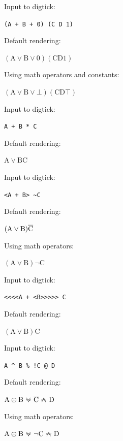 \documentclass{article}
\begin{document}
\begin{minipage}{\linewidth}
Input to digtick:
\begin{sourcebox}\texttt{(A + B + 0) (C D 1)}\end{sourcebox}
Default rendering:
\begin{renderedbox}$\mathrm{(A \vee B \vee 0) (C D 1)}$\end{renderedbox}
Using math operators and constants:
\begin{renderedbox}$\mathrm{(A \vee B \vee \bot) (C D \top)}$\end{renderedbox}
\end{minipage}
\vspace{2cm}

\begin{minipage}{\linewidth}
Input to digtick:
\begin{sourcebox}\texttt{A + B * C}\end{sourcebox}
Default rendering:
\begin{renderedbox}$\mathrm{A \vee B C}$\end{renderedbox}
\end{minipage}
\vspace{2cm}

\begin{minipage}{\linewidth}
Input to digtick:
\begin{sourcebox}\texttt{<A + B> \~{}C}\end{sourcebox}
Default rendering:
\begin{renderedbox}$\mathrm{(A \vee B) \overline{C}}$\end{renderedbox}
Using math operators:
\begin{renderedbox}$\mathrm{(A \vee B) \neg C}$\end{renderedbox}
\end{minipage}
\vspace{2cm}

\begin{minipage}{\linewidth}
Input to digtick:
\begin{sourcebox}\texttt{<<<<A + <B>>>>> C}\end{sourcebox}
Default rendering:
\begin{renderedbox}$\mathrm{(A \vee B) C}$\end{renderedbox}
\end{minipage}
\vspace{2cm}

\begin{minipage}{\linewidth}
Input to digtick:
\begin{sourcebox}\texttt{A \^{} B \% !C @ D}\end{sourcebox}
Default rendering:
\begin{renderedbox}$\mathrm{A \oplus B \bnor \bnot{C} \bnand D}$\end{renderedbox}
Using math operators:
\begin{renderedbox}$\mathrm{A \oplus B \bnor \neg C \bnand D}$\end{renderedbox}
\end{minipage}
\vspace{2cm}
\end{document}
